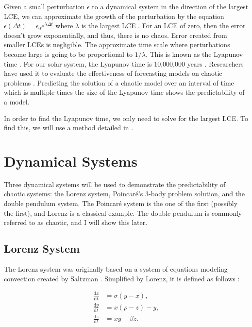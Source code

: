 \documentclass{article}
\newcommand{\der}[2][t]{\frac{\mathrm{d}#2}{\mathrm{d}#1}}
\begin{document}
Given a small perturbation $\epsilon$ to a dynamical system in the direction of 
the largest LCE, we can approximate the growth of the perturbation by the 
equation $\epsilon(\Delta t) = \epsilon_0 e^{\lambda \Delta t}$ where $\lambda$ 
is the largest LCE
\cite{bezruchko2010extracting}. For an LCE of zero, then the error doesn't grow
exponentially, and thus, there is no chaos. Error created
from smaller LCEs is negligible. The approximate time scale where 
perturbations become large is going to be proportional to $1 / \lambda$. This is
known as the Lyapunov time \cite{bezruchko2010extracting}. For our solar
system, the Lyapunov time is 10,000,000 years \cite{oestreicher2007history}.
Researchers have used it to evaluate the effectiveness of forecasting models on
chaotic problems \cite{pathak2018model}. Predicting the solution of
a chaotic model over an interval of time which is multiple times the size of the
Lyapunov time shows the predictability of a model.

In order to find the Lyapunov time, we only need to solve for the largest LCE. 
To find this, we will use a method detailed in \cite{viswanath1998lyapunov}.


\section{Dynamical Systems}

Three dynamical systems will be used to demonstrate the predictability of 
chaotic systems: the Lorenz system, Poincaré's 3-body 
problem solution, and the double pendulum system.
The Poincaré system is the one of the first (possibly the first), and Lorenz
is a classical example. The double pendulum is commonly referred to as chaotic, 
and I will show this later.

\subsection{Lorenz System}

The Lorenz system was originally based on a system of equations modeling 
convection created by Saltzman \cite{lorenz1963deterministic} 
\cite{saltzman1962finite}. Simplified by Lorenz, it is defined as follows
\cite{lorenz1963deterministic}:

\begin{align}
    \der{x} &= \sigma (y - x), \nonumber \\
    \der{y} &= x (\rho - z) - y, \nonumber \\
    \der{z} &= x y - \beta z. \label{eq:lorenz_equation}
\end{align}
\end{document}
